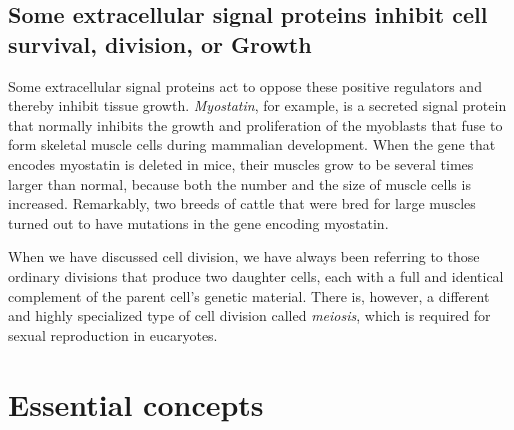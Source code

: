 \subsection{Some extracellular signal proteins inhibit cell survival, division, or Growth}

Some extracellular signal proteins act to oppose these positive regulators and thereby inhibit tissue growth.
\textit{Myostatin}, for example, is a secreted signal protein that normally inhibits
the growth and proliferation of the myoblasts that fuse to form skeletal
muscle cells during mammalian development. When the gene that
encodes myostatin is deleted in mice, their muscles grow to be several
times larger than normal, because both the number and the size of muscle
cells is increased. Remarkably, two breeds of cattle that were bred for
large muscles turned out to have mutations in the gene encoding myostatin.

When we have discussed cell division, we have always
been referring to those ordinary divisions that produce two daughter
cells, each with a full and identical complement of the parent cell’s
genetic material. There is, however, a different and highly specialized
type of cell division called \textit{meiosis}, which is required for sexual reproduction
in eucaryotes.


















\section{Essential concepts}

